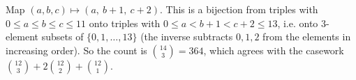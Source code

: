 Map $(a,b,c)\mapsto(a,\ b+1,\ c+2)$. This is a bijection from triples with $0\le a\le b\le c\le11$ onto triples with $0\le a<b+1<c+2\le13$, i.e. onto $3$-element subsets of $\{0,1,\dots,13\}$ (the inverse subtracts $0,1,2$ from the elements in increasing order). So the count is $\binom{14}3=\boxed{364}$, which agrees with the casework $\binom{12}3+2\binom{12}2+\binom{12}1$.
